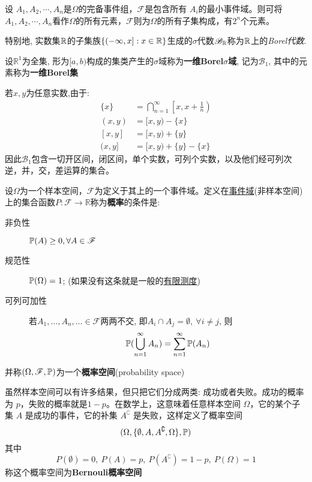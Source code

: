 \begin{example}
    设 $A_1, A_2, \cdots, A_n$是$\Omega$的完备事件组，$\mathcal{F}$是包含所有 $A_i$的最小事件域。则可将$A_1, A_2, \cdots, A_n$看作$\Omega$的所有元素，$\mathcal{F}$则为$\Omega$的所有子集构成，有$2^n$个元素。
\end{example}

特别地, 实数集$\R$的子集族$\{(-\infty,x] : x\in\R\}$生成的$\sigma$代数$\mathscr{B}_{\R}$称为$\R$上的\emph{Borel代数}.

\begin{definition}[Borel集]
    设$\mathbb{R}^1$为全集, 形为$[a,b)$构成的集类产生的$\sigma$域称为\textbf{一维Borel$\sigma$域}, 记为$\mathscr{B}_1$, 其中的元素称为\textbf{一维Borel集}
\end{definition}

若$x,y$为任意实数,由于:
\begin{align*}
    \{x\}  & =  \bigcap_{n=1}^{\infty}\left[x, x+\frac1{n}\right) \\
    (x, y) & =  [x, y)-\{x\}                                      \\
    [x, y] & =  [x, y)+\{y\}                                      \\
    (x, y] & =  [x, y)+\{y\}-\{x\}
\end{align*}
因此$\mathscr{B}_1$包含一切开区间，闭区间，单个实数，可列个实数，以及他们经可列次逆，并，交，差运算的集合。


\begin{definition}[概率空间]
    设$\Omega$为一个样本空间，$\mathscr{F}$为定义于其上的一个事件域。定义在\underline{事件域}(非样本空间)上的集合函数$P : \mathscr{F} \to \mathbb{R}$称为\textbf{概率}的条件是:
    \begin{description}
        \item[非负性]$\P(A)\ge 0 , \forall A \in \mathscr{F}$
        \item[规范性]$\P(\Omega) = 1$; (如果没有这条就是一般的\underline{有限测度})
        \item[可列可加性] 若$A_{1},\dots,A_{n},\ldots \in \mathscr{F}$两两不交, 即$A_{i}\cap A_{j} = \emptyset, \ \forall i\neq j$, 则
            \[ \P(\bigcup_{n=1}^{\infty}A_{n}) = \sum_{n=1}^{\infty}\P(A_{n}) \]
    \end{description}
    并称$(\Omega,\mathscr{F},\P)$为一个\textbf{概率空间}(probability space)
\end{definition}

\begin{example}[Bernouli概率空间]
    虽然样本空间可以有许多结果，但只把它们分成两类: 成功或者失败。成功的概率为 $p$，失败的概率就是$1 - p$。在数学上，这意味着任意样本空间 $\Omega$，它的某个子集 $A$ 是成功的事件，它的补集 $A^{\complement}$ 是失败，这样定义了概率空间
    \[ (\Omega, \{\emptyset, A, A^{\complement}, \Omega\},\P) \]
    其中
    \[ P(\emptyset) = 0,\ P(A)= p,\ P(A^{\complement})= 1 - p,\ P(\Omega)=1 \]
    称这个概率空间为\textbf{Bernouli概率空间}
\end{example}

